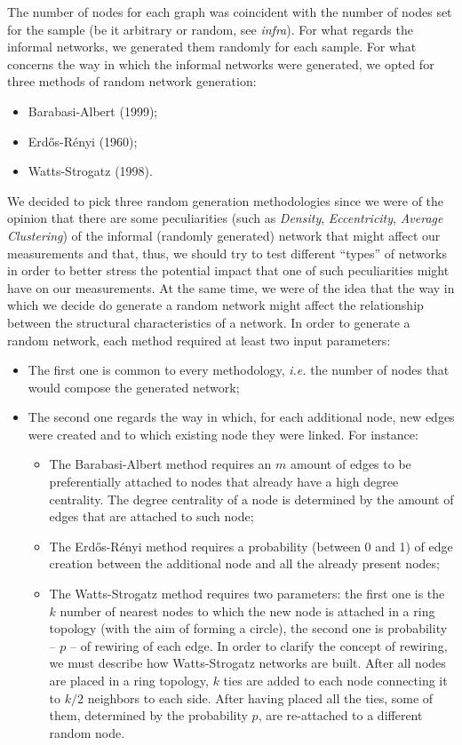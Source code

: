 \documentclass{article}
\begin{document}
The number of nodes for each graph was coincident with the number of nodes set for the sample (be it arbitrary or random, see \emph{infra}). 
For what regards the informal networks, we generated them randomly for each sample. For what concerns the way in which the informal networks were generated, we opted for three methods of random network generation:
\begin{itemize}
	\item Barabasi-Albert (1999);
	\item Erdős-Rényi (1960);
	\item Watts-Strogatz (1998).
\end{itemize}
We decided to pick three random generation methodologies since we were of the opinion that there are some peculiarities (such as \emph{Density}, \emph{Eccentricity}, \emph{Average Clustering}) of the informal (randomly generated) network that might affect our measurements and that, thus, we should try to test different “types” of networks in order to better stress the potential impact that one of such peculiarities might have on our measurements.
At the same time, we were of the idea that the way in which we decide do generate a random network might affect the relationship between the structural characteristics of a network. 
In order to generate a random network, each method required at least two input parameters:
\begin{itemize}
	\item The first one is common to every methodology, \emph{i.e.} the number of nodes that would compose the generated network;
	\item The second one regards the way in which, for each additional node, new edges were created and to which existing node they were linked. For instance:
	\begin{itemize}
		\item The Barabasi-Albert method requires an $m$ amount of edges to be preferentially attached to nodes that already have a high degree centrality. The degree centrality of a node is determined by the amount of edges that are attached to such node;
		\item The Erdős-Rényi method requires a probability (between 0 and 1) of edge creation between the additional node and all the already present nodes;
		\item The Watts-Strogatz method requires two parameters: the first one is the $k$ number of nearest nodes to which the new node is attached in a ring topology (with the aim of forming a circle), the second one is probability – $p$ – of  rewiring of each edge. In order to clarify the concept of rewiring, we must describe how Watts-Strogatz networks are built. After all nodes are placed in a ring topology, $k$ ties are added to each node connecting it to $k/2$ neighbors to each side. After having placed all the ties, some of them, determined by the probability $p$, are re-attached to a different random node. 
	\end{itemize}
\end{itemize}
\end{document}
